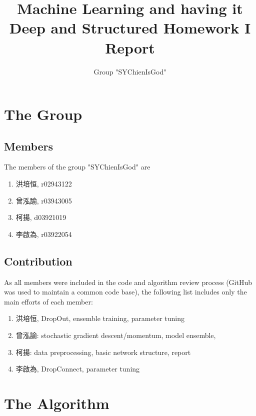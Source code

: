 \documentclass[]{article}
\title{Machine Learning and having it Deep and Structured Homework I Report}
\author{Group "SYChienIsGod"}
\begin{document}
\maketitle


\section{The Group}
\subsection{Members}
The members of the group "SYChienIsGod" are
\begin{CJK}{UTF8}{bsmi}
\begin{enumerate}
	\item 洪培恒, r02943122
	\item 曾泓諭, r03943005
	\item 柯揚, d03921019
	\item 李啟為, r03922054 
\end{enumerate}
\end{CJK}
\subsection{Contribution}
As all members were included in the code and algorithm review process (GitHub was used to maintain a common code base), the following list includes only the main efforts of each member:
\begin{CJK}{UTF8}{bsmi}
	\begin{enumerate}
		\item 洪培恒, DropOut, ensemble training, parameter tuning
		\item 曾泓諭: stochastic gradient descent/momentum, model ensemble, 
		\item 柯揚: data preprocessing, basic network structure, report
		\item 李啟為, DropConnect, parameter tuning
	\end{enumerate}
\end{CJK}
\section{The Algorithm}
\end{document}
